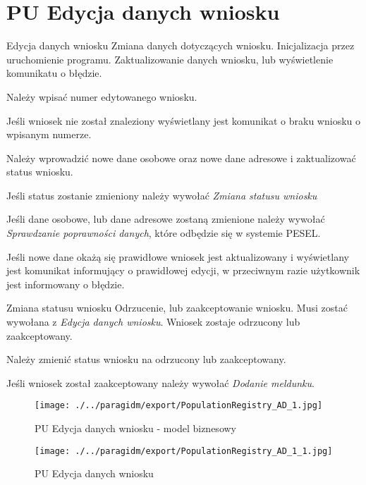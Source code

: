 \documentclass[12pt]{article}
\begin{document}
\section{PU Edycja danych wniosku}

\scenario
    {Edycja danych wniosku}
    {Zmiana danych dotyczących wniosku.}
    {Inicjalizacja przez uruchomienie programu.}
    {Zaktualizowanie danych wniosku, lub wyświetlenie komunikatu o błędzie.}
    {
        \item Należy wpisać numer edytowanego wniosku.
        \item Jeśli wniosek nie został znaleziony wyświetlany jest komunikat o braku wniosku o wpisanym numerze.
        \item Należy wprowadzić nowe dane osobowe oraz nowe dane adresowe i zaktualizować status wniosku.
        \item Jeśli status zostanie zmieniony należy wywołać \textit{Zmiana statusu wniosku}
        \item Jeśli dane osobowe, lub dane adresowe zostaną zmienione należy wywołać \textit{Sprawdzanie poprawności danych}, które odbędzie się w systemie PESEL.
        \item Jeśli nowe dane okażą się prawidłowe wniosek jest aktualizowany i wyświetlany jest komunikat informujący o prawidłowej edycji, w przeciwnym razie użytkownik jest informowany o błędzie.
    }

\scenario
    {Zmiana statusu wniosku}
    {Odrzucenie, lub zaakceptowanie wniosku.}
    {Musi zostać wywołana z \textit{Edycja danych wniosku}.}
    {Wniosek zostaje odrzucony lub zaakceptowany.}
    {
        \item Należy zmienić status wniosku na odrzucony lub zaakceptowany.
        \item Jeśli wniosek został zaakceptowany należy wywołać \textit{Dodanie meldunku}.
    }

    \begin{sidewaysfigure}[!h]
        \centering
        \texttt{[image: ./../paragidm/export/PopulationRegistry\_AD\_1.jpg]}
        \caption{PU Edycja danych wniosku - model biznesowy}
        \label{}
    \end{sidewaysfigure}

    \begin{sidewaysfigure}[!h]
        \centering
        \texttt{[image: ./../paragidm/export/PopulationRegistry\_AD\_1\_1.jpg]}
        \caption{PU Edycja danych wniosku}
        \label{}
    \end{sidewaysfigure}
\end{document}
